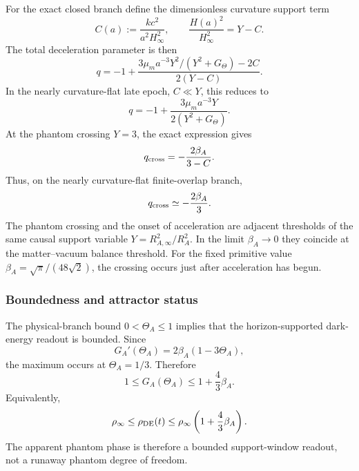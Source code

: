 \documentclass[12pt,a4paper]{article}
\begin{document}
For the exact closed branch define the dimensionless curvature support term
\begin{equation}
\label{p8:eq:hs-curvature-C}
    C(a):=\frac{k c^2}{a^2H_\infty^2},
    \qquad
    \frac{H(a)^2}{H_\infty^2}=Y-C.
\end{equation}
The total deceleration parameter is then
\begin{equation}
\label{p8:eq:hs-q-curvature-result}
    q
    =
    -1+
    \frac{
    3\mu_m a^{-3}Y^2/(Y^2+G_\Theta)-2C
    }{
    2(Y-C)
    }.
\end{equation}
In the nearly curvature-flat late epoch, \(C\ll Y\), this reduces to
\begin{equation}
\label{p8:eq:hs-q-result}
    q
    =
    -1+
    \frac{
    3\mu_m a^{-3}Y
    }{
    2\left(Y^2+G_\Theta\right)
    }.
\end{equation}
At the phantom crossing \(Y=3\), the exact expression gives
\begin{equation}
\label{p8:eq:hs-q-crossing-curvature}
    q_{\rm cross}
    =
    -\frac{2\beta_A}{3-C}.
\end{equation}
Thus, on the nearly curvature-flat finite-overlap branch,
\begin{equation}
\label{p8:eq:hs-q-crossing}
    q_{\rm cross}
    \simeq
    -\frac{2\beta_A}{3}.
\end{equation}
The phantom crossing and the onset of acceleration are adjacent thresholds of
the same causal support variable \(Y=R_{A,\infty}^2/R_A^2\).  In the limit
\(\beta_A\to0\) they coincide at the matter--vacuum balance threshold.  For
the fixed primitive value \(\beta_A=\sqrt\pi/(48\sqrt2)\), the crossing occurs
just after acceleration has begun.

\subsubsection{Boundedness and attractor status}
\label{p8:app:horizon-boundedness}

The physical-branch bound \(0<\Theta_A\le1\) implies that the
horizon-supported dark-energy readout is bounded.  Since
\begin{equation}
    G_A'(\Theta_A)=2\beta_A(1-3\Theta_A),
\end{equation}
the maximum occurs at \(\Theta_A=1/3\).  Therefore
\begin{equation}
\label{p8:eq:hs-GA-bounds}
    1\le G_A(\Theta_A)\le 1+\frac43\beta_A.
\end{equation}
Equivalently,
\begin{equation}
\label{p8:eq:hs-rhoDE-bounds}
    \rho_\infty
    \le
    \rho_{\rm DE}(t)
    \le
    \rho_\infty\left(1+\frac43\beta_A\right).
\end{equation}
The apparent phantom phase is therefore a bounded support-window readout, not
a runaway phantom degree of freedom.
\end{document}
